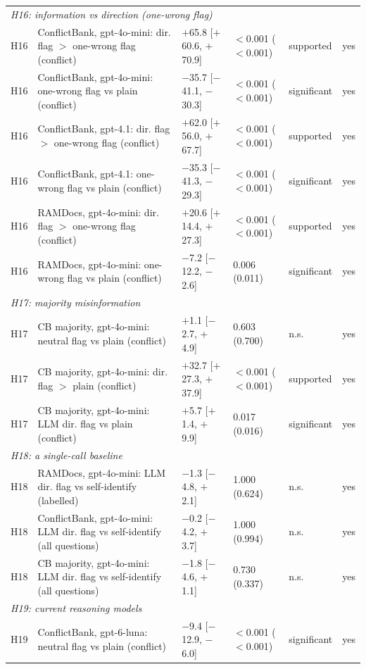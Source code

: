 \begin{table}[p]
{\begin{tabular}{lp{6.6cm}llll}
\multicolumn{6}{l}{\emph{H16: information vs direction (one-wrong flag)}} \\
H16 & ConflictBank, gpt-4o-mini: dir. flag $>$ one-wrong flag (conflict) & $+$65.8 [$+$60.6, $+$70.9] & $<$0.001 ($<$0.001) & supported & yes \\
H16 & ConflictBank, gpt-4o-mini: one-wrong flag vs plain (conflict) & $-$35.7 [$-$41.1, $-$30.3] & $<$0.001 ($<$0.001) & significant & yes \\
H16 & ConflictBank, gpt-4.1: dir. flag $>$ one-wrong flag (conflict) & $+$62.0 [$+$56.0, $+$67.7] & $<$0.001 ($<$0.001) & supported & yes \\
H16 & ConflictBank, gpt-4.1: one-wrong flag vs plain (conflict) & $-$35.3 [$-$41.3, $-$29.3] & $<$0.001 ($<$0.001) & significant & yes \\
H16 & RAMDocs, gpt-4o-mini: dir. flag $>$ one-wrong flag (conflict) & $+$20.6 [$+$14.4, $+$27.3] & $<$0.001 ($<$0.001) & supported & yes \\
H16 & RAMDocs, gpt-4o-mini: one-wrong flag vs plain (conflict) & $-$7.2 [$-$12.2, $-$2.6] & 0.006 (0.011) & significant & yes \\
\multicolumn{6}{l}{\emph{H17: majority misinformation}} \\
H17 & CB majority, gpt-4o-mini: neutral flag vs plain (conflict) & $+$1.1 [$-$2.7, $+$4.9] & 0.603 (0.700) & n.s. & yes \\
H17 & CB majority, gpt-4o-mini: dir. flag $>$ plain (conflict) & $+$32.7 [$+$27.3, $+$37.9] & $<$0.001 ($<$0.001) & supported & yes \\
H17 & CB majority, gpt-4o-mini: LLM dir. flag vs plain (conflict) & $+$5.7 [$+$1.4, $+$9.9] & 0.017 (0.016) & significant & yes \\
\multicolumn{6}{l}{\emph{H18: a single-call baseline}} \\
H18 & RAMDocs, gpt-4o-mini: LLM dir. flag vs self-identify (labelled) & $-$1.3 [$-$4.8, $+$2.1] & 1.000 (0.624) & n.s. & yes \\
H18 & ConflictBank, gpt-4o-mini: LLM dir. flag vs self-identify (all questions) & $-$0.2 [$-$4.2, $+$3.7] & 1.000 (0.994) & n.s. & yes \\
H18 & CB majority, gpt-4o-mini: LLM dir. flag vs self-identify (all questions) & $-$1.8 [$-$4.6, $+$1.1] & 0.730 (0.337) & n.s. & yes \\
\multicolumn{6}{l}{\emph{H19: current reasoning models}} \\
H19 & ConflictBank, gpt-6-luna: neutral flag vs plain (conflict) & $-$9.4 [$-$12.9, $-$6.0] & $<$0.001 ($<$0.001) & significant & yes \\

\end{tabular}}
\end{table}
